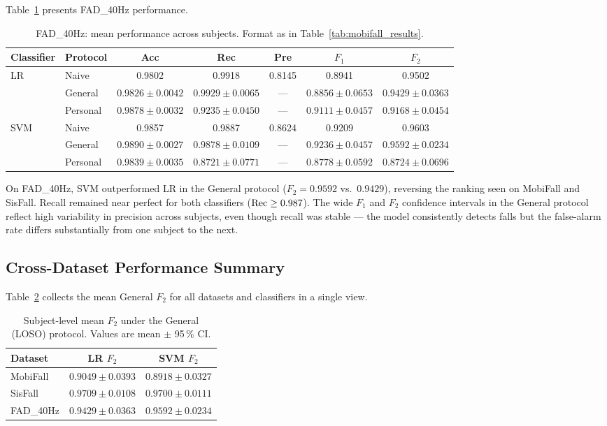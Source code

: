 Table~\ref{tab:fad_results} presents FAD\_40Hz performance.

\begin{table}[h!]
\centering
\caption{FAD\_40Hz: mean performance across subjects.  Format as in
  Table~\ref{tab:mobifall_results}.}
\label{tab:fad_results}
\setlength{\tabcolsep}{3pt}\footnotesize
\begin{tabular}{llccccc}
\toprule
\textbf{Classifier} & \textbf{Protocol}
  & \textbf{Acc} & \textbf{Rec} & \textbf{Pre}
  & \textbf{$F_1$} & \textbf{$F_2$} \\
\midrule
\multirow{3}{*}{LR}
 & Naive
   & 0.9802 & 0.9918 & 0.8145 & 0.8941 & 0.9502 \\
 & General
   & $0.9826 \pm 0.0042$ & $0.9929 \pm 0.0065$ & ---
   & $0.8856 \pm 0.0653$ & $0.9429 \pm 0.0363$ \\
 & Personal
   & $0.9878 \pm 0.0032$ & $0.9235 \pm 0.0450$ & ---
   & $0.9111 \pm 0.0457$ & $0.9168 \pm 0.0454$ \\
\midrule
\multirow{3}{*}{SVM}
 & Naive
   & 0.9857 & 0.9887 & 0.8624 & 0.9209 & 0.9603 \\
 & General
   & $0.9890 \pm 0.0027$ & $0.9878 \pm 0.0109$ & ---
   & $0.9236 \pm 0.0457$ & $0.9592 \pm 0.0234$ \\
 & Personal
   & $0.9839 \pm 0.0035$ & $0.8721 \pm 0.0771$ & ---
   & $0.8778 \pm 0.0592$ & $0.8724 \pm 0.0696$ \\
\bottomrule
\end{tabular}
\end{table}

On FAD\_40Hz, SVM outperformed LR in the General protocol ($F_2 = 0.9592$ vs.\ $0.9429$), reversing the ranking seen on MobiFall and SisFall. Recall remained near perfect for both classifiers ($\operatorname{Rec} \geq 0.987$). The wide $F_1$ and $F_2$ confidence intervals in the General protocol reflect high variability in precision across subjects, even though recall was stable --- the model consistently detects falls but the false-alarm rate differs substantially from one subject to the next.

\subsection{Cross-Dataset Performance Summary}
\label{subsubsec:summary}

Table~\ref{tab:summary} collects the mean General $F_2$ for all datasets and classifiers in a single view.

\begin{table}[h!]
\centering
\caption{Subject-level mean $F_2$ under the General (LOSO) protocol.
  Values are mean $\pm$ 95\,\% CI.}
\label{tab:summary}
\begin{tabular}{lcc}
\toprule
\textbf{Dataset} & \textbf{LR $F_2$} & \textbf{SVM $F_2$} \\
\midrule
MobiFall   & $0.9049 \pm 0.0393$ & $0.8918 \pm 0.0327$ \\
SisFall    & $0.9709 \pm 0.0108$ & $0.9700 \pm 0.0111$ \\
FAD\_40Hz  & $0.9429 \pm 0.0363$ & $0.9592 \pm 0.0234$ \\
\bottomrule
\end{tabular}
\end{table}

